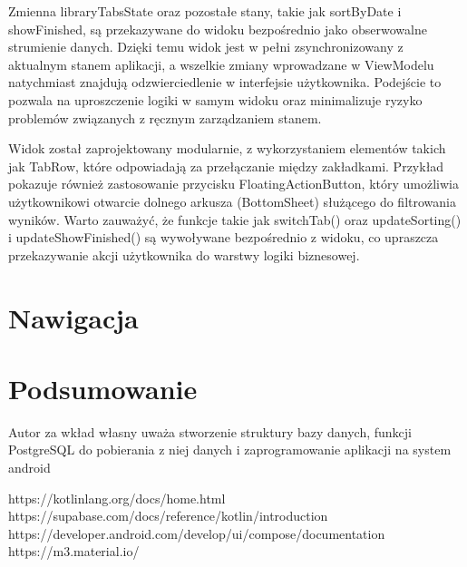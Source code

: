 \documentclass[12pt,twoside]{article}
\begin{document}
Zmienna libraryTabsState oraz pozostałe stany, takie jak sortByDate i showFinished, są przekazywane do widoku 
bezpośrednio jako obserwowalne strumienie danych. Dzięki temu widok jest w pełni zsynchronizowany z aktualnym 
stanem aplikacji, a wszelkie zmiany wprowadzane w ViewModelu natychmiast znajdują odzwierciedlenie w interfejsie 
użytkownika. Podejście to pozwala na uproszczenie logiki w samym widoku oraz minimalizuje ryzyko problemów 
związanych z ręcznym zarządzaniem stanem.

Widok został zaprojektowany modularnie, z wykorzystaniem elementów takich jak TabRow, które odpowiadają za 
przełączanie między zakładkami. Przykład pokazuje również zastosowanie przycisku FloatingActionButton, który 
umożliwia użytkownikowi otwarcie dolnego arkusza (BottomSheet) służącego do filtrowania wyników. Warto zauważyć, 
że funkcje takie jak switchTab() oraz updateSorting() i updateShowFinished() są wywoływane bezpośrednio z widoku, 
co upraszcza przekazywanie akcji użytkownika do warstwy logiki biznesowej.

\clearpage

\section{Nawigacja}

\clearpage

\section{Podsumowanie}

Autor za wkład własny uważa stworzenie struktury bazy danych, funkcji PostgreSQL do pobierania z niej danych i 
zaprogramowanie aplikacji na system android 

\clearpage


\begin{thebibliography}{4}
	\bibitem{} https://kotlinlang.org/docs/home.html
	\bibitem{} https://supabase.com/docs/reference/kotlin/introduction
	\bibitem{} https://developer.android.com/develop/ui/compose/documentation
	\bibitem{} https://m3.material.io/
\end{thebibliography}

\clearpage

\makesummary
\end{document}
